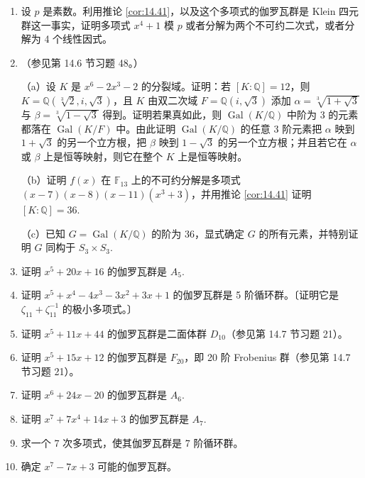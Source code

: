 \begin{enumerate}
\item 设 \(p\) 是素数。利用推论 \ref{cor:14.41}，以及这个多项式的伽罗瓦群是 Klein 四元群这一事实，证明多项式 \(x^4+1\) 模 \(p\) 或者分解为两个不可约二次式，或者分解为 4 个线性因式。

\item （参见第 14.6 节习题 48。）

（a）设 \(K\) 是 \(x^6-2x^3-2\) 的分裂域。证明：若 \([K:\mathbb{Q}] = 12\)，则 \(K = \mathbb{Q}(\sqrt[3]{2}, i, \sqrt{3})\)，且 \(K\) 由双二次域 \(F = \mathbb{Q}(i, \sqrt{3})\) 添加 \(\alpha = \sqrt[3]{1+\sqrt{3}}\) 与 \(\beta = \sqrt[3]{1-\sqrt{3}}\) 得到。证明若果真如此，则 \(\operatorname{Gal}(K/\mathbb{Q})\) 中阶为 3 的元素都落在 \(\operatorname{Gal}(K/F)\) 中。由此证明 \(\operatorname{Gal}(K/\mathbb{Q})\) 的任意 3 阶元素把 \(\alpha\) 映到 \(1+\sqrt{3}\) 的另一个立方根，把 \(\beta\) 映到 \(1-\sqrt{3}\) 的另一个立方根；并且若它在 \(\alpha\) 或 \(\beta\) 上是恒等映射，则它在整个 \(K\) 上是恒等映射。

（b）证明 \(f(x)\) 在 \(\mathbb{F}_{13}\) 上的不可约分解是多项式 \((x-7)(x-8)(x-11)(x^3+3)\)，并用推论 \ref{cor:14.41} 证明 \([K:\mathbb{Q}] = 36\).

（c）已知 \(G = \operatorname{Gal}(K/\mathbb{Q})\) 的阶为 36，显式确定 \(G\) 的所有元素，并特别证明 \(G\) 同构于 \(S_3 \times S_3\).

\item 证明 \(x^5+20x+16\) 的伽罗瓦群是 \(A_5\).

\item 证明 \(x^5+x^4-4x^3-3x^2+3x+1\) 的伽罗瓦群是 5 阶循环群。〔证明它是 \(\zeta_{11}+\zeta_{11}^{-1}\) 的极小多项式。〕

\item 证明 \(x^5+11x+44\) 的伽罗瓦群是二面体群 \(D_{10}\)（参见第 14.7 节习题 21）。

\item 证明 \(x^5+15x+12\) 的伽罗瓦群是 \(F_{20}\)，即 20 阶 Frobenius 群（参见第 14.7 节习题 21）。

\item 证明 \(x^6+24x-20\) 的伽罗瓦群是 \(A_6\).

\item 证明 \(x^7+7x^4+14x+3\) 的伽罗瓦群是 \(A_7\).

\item 求一个 7 次多项式，使其伽罗瓦群是 7 阶循环群。

\item 确定 \(x^7-7x+3\) 可能的伽罗瓦群。
\end{enumerate}

